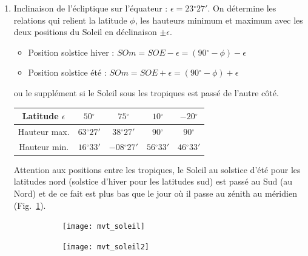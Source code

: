 \documentclass[a4paper,10pt]{report}
\renewcommand{\deg}{\ensuremath{^{\circ}}}
\begin{document}
\begin{Answer}
  \begin{enumerate}
  \item Inclinaison de l'écliptique sur l'équateur :
    $\epsilon=23\deg27'$. On détermine les relations qui relient la
    latitude $\phi$, les hauteurs minimum et maximum avec les deux
    positions du Soleil en déclinaison $\pm \epsilon$.
    \begin{itemize}
    \item Position solstice hiver : $SOm = SOE - \epsilon =
      (90\deg-\phi) -\epsilon$
    \item Position solstice été : $SOm = SOE + \epsilon =
      (90\deg-\phi) +\epsilon$
    \end{itemize}
    ou le supplément si le Soleil sous les tropiques est passé de
    l'autre côté.
    \begin{center}
      \begin{tabular}{|c|c|c|c|c|}
        \hline
        Latitude $\epsilon$ & $50\deg$ & $75\deg$ & $10\deg$ &
        $-20\deg$ \\
        \hline
        Hauteur max. & $63\deg27'$ & $38\deg27'$ & $90\deg$ &
        $90\deg$ \\
        \hline
        Hauteur min. & $16\deg33'$ & $-08\deg27'$ & $56\deg33'$
        & $46\deg33'$ \\
        \hline
      \end{tabular}
    \end{center}
    Attention aux positions entre les tropiques, le Soleil au solstice
    d'été pour les latitudes nord (solstice d'hiver pour les latitudes
    sud) est passé au Sud (au Nord) et de ce fait est plus bas que le
    jour où il passe au zénith au méridien (Fig.~\ref{mvtsolaire}).

    \begin{figure}
      \centering
      \begin{subfigure}[b]{0.45\textwidth}
        \centering
        \texttt{[image: mvt\_soleil]}
        \caption{}
        \label{mvtsolaire}
      \end{subfigure}
      \begin{subfigure}[b]{0.45\textwidth}
        \centering
        \texttt{[image: mvt\_soleil2]}
        \caption{}
        \label{mvtsolaire2}
      \end{subfigure}
      \caption{}
    \end{figure}


\end{enumerate}
\end{Answer}
\end{document}
